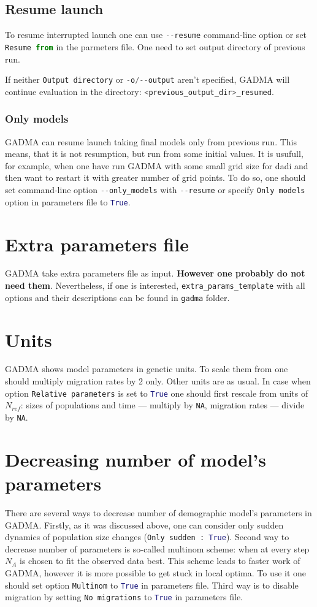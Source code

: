 \documentclass[12pt]{article}
\makeatletter
\newcommand{\py}[1]{\lstinline[language=Python, showstringspaces=False]@#1@}
\makeatother
\begin{document}
\subsection{Resume launch}
To resume interrupted launch one can use \py{--resume} command-line option or set \py{Resume from} in the parmeters file. One need to set output directory of previous run.

If neither \py{Output directory} or \py{-o/--output} aren't specified, GADMA will continue evaluation in the directory: \py{<previous_output_dir>_resumed}.

\subsubsection{Only models}
GADMA can resume launch taking final models only from previous run. This means, that it is not resumption, but run from some initial values. It is usufull, for example, when one have run GADMA with some small grid size for dadi and then want to restart it with greater number of grid points. To do so, one should set command-line option \py{--only_models} with \py{--resume} or specify \py{Only models} option in parameters file to \py{True}.

\section{Extra parameters file}
GADMA take extra parameters file as input. \textbf{However one probably do not need them}. Nevertheless, if one is interested, \py{extra_params_template} with all options and their descriptions can be found in \py{gadma} folder.

\section{Units}
GADMA shows model parameters in genetic units. To scale them from one should multiply migration rates by 2 only. Other units are as usual. In case when option \py{Relative parameters} is set to \py{True} one should first rescale from units of $N_{ref}$: sizes of populations and time --- multiply by \py{NA}, migration rates --- divide by \py{NA}.

\section{Decreasing number of model's parameters}
There are several ways to decrease number of demographic model's parameters in GADMA. Firstly, as it was discussed above, one can consider only sudden dynamics of population size changes (\py{Only sudden : True}). Second way to decrease number of parameters is so-called multinom scheme: when at every step $N_A$ is chosen to fit the observed data best. This scheme leads to faster work of GADMA, however it is more possible to get stuck in local optima. To use it one should set option \py{Multinom} to \py{True} in parameters file. Third way is to disable migration by setting \py{No migrations} to \py{True} in parameters file.
\end{document}
